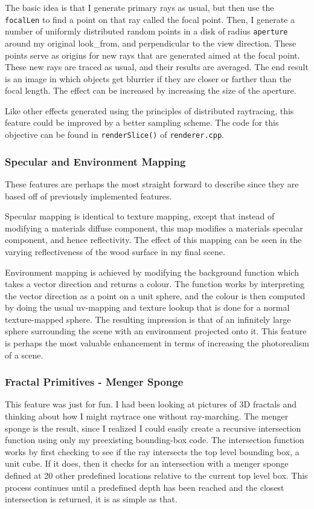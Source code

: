 \documentclass[12pt]{article}
\begin{document}
The basic idea is that I generate primary rays as usual, but then use the \texttt{focalLen} to find a point on that ray called the focal point. Then, I generate a number of uniformly distributed random points in a disk of radius \texttt{aperture} around my original look\_from, and perpendicular to the view direction. These points serve as origins for new rays that are generated aimed at the focal point. These new rays are traced as usual, and their results are averaged. The end result is an image in which objects get blurrier if they are closer or farther than the focal length. The effect can be increased by increasing the size of the aperture.

Like other effects generated using the principles of distributed raytracing, this feature could be improved by a better sampling scheme.
The code for this objective can be found in \texttt{renderSlice()} of \texttt{renderer.cpp}.

\subsubsection{Specular and Environment Mapping}

These features are perhaps the most straight forward to describe since they are based off of previously implemented features.

Specular mapping is identical to texture mapping, except that instead of modifying a materials diffuse component, this map modifies a materials specular component, and hence reflectivity. The effect of this mapping can be seen in the varying reflectiveness of the wood surface in my final scene.

Environment mapping is achieved by modifying the background function which takes a vector direction and returns a colour. The function works by interpreting the vector direction as a point on a unit sphere, and the colour is then computed by doing the usual uv-mapping and texture lookup that is done for a normal texture-mapped sphere. The resulting impression is that of an infinitely large sphere surrounding the scene with an environment projected onto it. This feature is perhaps the most valuable enhancement in terms of increasing the photorealism of a scene.

\subsubsection{Fractal Primitives - Menger Sponge}

This feature was just for fun. I had been looking at pictures of 3D fractals and thinking about how I might raytrace one without ray-marching. The menger sponge is the result, since I realized I could easily create a recursive intersection function using only my preexisting bounding-box code. The intersection function works by first checking to see if the ray intersects the top level bounding box, a unit cube. If it does, then it checks for an intersection with a menger sponge defined at 20 other predefined locations relative to the current top level box. This process continues until a predefined depth has been reached and the closest intersection is returned, it is as simple as that.
\end{document}
